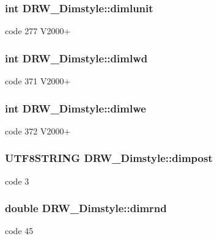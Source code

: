 \subsubsection[{dimlunit}]{\setlength{\rightskip}{0pt plus 5cm}int D\+R\+W\+\_\+\+Dimstyle\+::dimlunit}\label{class_d_r_w___dimstyle_a3e2bc803306737f75c7a0390c0dbc5cd}
code 277 V2000+ \hypertarget{class_d_r_w___dimstyle_a1547ae00544ee4cc865e30847220b5a3}{}
\subsubsection[{dimlwd}]{\setlength{\rightskip}{0pt plus 5cm}int D\+R\+W\+\_\+\+Dimstyle\+::dimlwd}\label{class_d_r_w___dimstyle_a1547ae00544ee4cc865e30847220b5a3}
code 371 V2000+ \hypertarget{class_d_r_w___dimstyle_a25f9fed17c3cbd6f0969d85a0fc42df4}{}
\subsubsection[{dimlwe}]{\setlength{\rightskip}{0pt plus 5cm}int D\+R\+W\+\_\+\+Dimstyle\+::dimlwe}\label{class_d_r_w___dimstyle_a25f9fed17c3cbd6f0969d85a0fc42df4}
code 372 V2000+ \hypertarget{class_d_r_w___dimstyle_ab4484303cfced1d7ad3c19a84b19dada}{}
\subsubsection[{dimpost}]{\setlength{\rightskip}{0pt plus 5cm}U\+T\+F8\+S\+T\+R\+I\+N\+G D\+R\+W\+\_\+\+Dimstyle\+::dimpost}\label{class_d_r_w___dimstyle_ab4484303cfced1d7ad3c19a84b19dada}
code 3 \hypertarget{class_d_r_w___dimstyle_abe4aea95c5bf8eca979c33d94ea2bb07}{}
\subsubsection[{dimrnd}]{\setlength{\rightskip}{0pt plus 5cm}double D\+R\+W\+\_\+\+Dimstyle\+::dimrnd}\label{class_d_r_w___dimstyle_abe4aea95c5bf8eca979c33d94ea2bb07}
code 45 \hypertarget{class_d_r_w___dimstyle_aa0bbdb436f7fe738ee5566a2a447170d}{}
